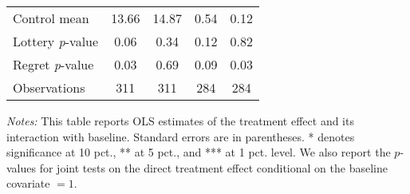 \begin{table}[ht]
{\begin{threeparttable}
\begin{tabular}{l*{4}{c}}
Control mean    &    13.66         &    14.87         &     0.54         &     0.12         \\
Lottery \emph{p}-value&     0.06         &     0.34         &     0.12         &     0.82         \\
Regret \emph{p}-value&     0.03         &     0.69         &     0.09         &     0.03         \\
Observations    &      311         &      311         &      284         &      284         \\
\bottomrule \end{tabular} \begin{tablenotes}[flushleft] \footnotesize \item \emph{Notes:} This table reports OLS estimates of the treatment effect and its interaction with baseline. Standard errors are in parentheses. * denotes significance at 10 pct., ** at 5 pct., and *** at 1 pct. level. We also report the \(p\)-values for joint tests on the direct treatment effect conditional on the baseline covariate $= 1$. \end{tablenotes} \end{threeparttable} } \end{table}

